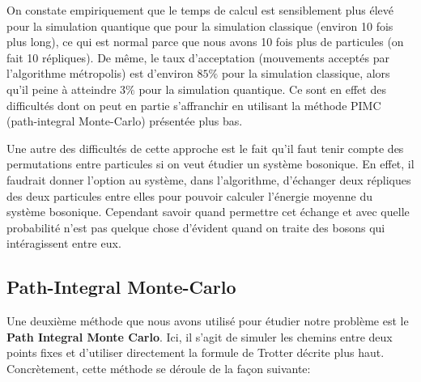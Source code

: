 \documentclass[11pt]{article}
\theoremstyle{definition}
\theoremstyle{remark}
\begin{document}
On constate empiriquement que le temps de calcul est sensiblement plus élevé pour la simulation quantique que pour la simulation classique (environ 10 fois plus long), ce qui est normal parce que nous avons 10 fois plus de particules (on fait 10 répliques). De même, le taux d'acceptation (mouvements acceptés par l'algorithme métropolis) est d'environ $85\%$ pour la simulation classique, alors qu'il peine à atteindre $3\%$ pour la simulation quantique. Ce sont en effet des difficultés dont on peut en partie s'affranchir en utilisant la méthode PIMC (path-integral Monte-Carlo) présentée plus bas.

Une autre des difficultés de cette approche est le fait qu'il faut tenir compte des permutations entre particules si on veut étudier un système bosonique. En effet, il faudrait donner l'option au système, dans l'algorithme, d'échanger deux répliques des deux particules entre elles pour pouvoir calculer l'énergie moyenne du système bosonique. Cependant savoir quand permettre cet échange et avec quelle probabilité n'est pas quelque chose d'évident quand on traite des bosons qui intéragissent entre eux.

\subsection{Path-Integral Monte-Carlo}

Une deuxième méthode que nous avons utilisé pour étudier notre problème est le \textbf{Path Integral Monte Carlo}. Ici, il s'agit de simuler les chemins entre deux points fixes et d'utiliser directement la formule de Trotter décrite plus haut. Concrètement, cette méthode se déroule de la façon suivante: 
\end{document}
